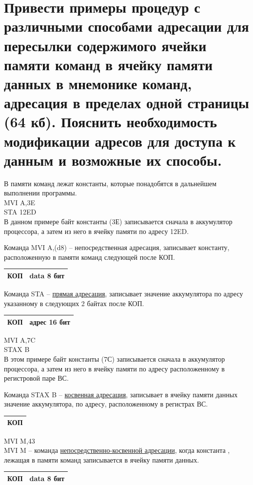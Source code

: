 \documentclass[unicode, 12pt, a4paper, oneside]{article}
\begin{document}
\section{Привести примеры процедур с различными способами адресации для пересылки содержимого ячейки памяти команд в ячейку памяти данных в мнемонике команд, адресация в пределах одной страницы (64 кб). Пояснить необходимость модификации адресов для доступа к данным и возможные их способы.}

В памяти команд лежат константы, которые понадобятся в дальнейшем выполнении программы.\\
MVI A,3E\\
STA 12ED\\
В данном примере байт константы (3Е) записывается сначала в аккумулятор процессора, а затем из него в ячейку памяти по адресу 12ED.

Команда MVI A,(d8) -- непосредственная адресация, записывает константу, расположенную в памяти команд  следующей после КОП.
\begin{center}
\begin{tabular}{|c|c|}
\hline КОП  & data 8 бит \\  
\hline 
\end{tabular}
\end{center}
Команда STA -- \underline{прямая адресация}, записывает значение аккумулятора по адресу указанному в следующих 2 байтах после КОП.
\begin{center}
\begin{tabular}{|c|c|}
\hline КОП & адрес 16 бит \\ 
\hline 
\end{tabular}
\end{center}
MVI A,7C\\ 
STAX B\\
В этом примере байт константы (7С) записывается сначала в аккумулятор процессора, а затем из него в ячейку памяти по адресу расположенному в регистровой паре ВС.

Команда STAX B -- \underline{косвенная адресация}, записывает в ячейку памяти данных значение аккумулятора, по адресу, расположенному в регистрах ВС.
\begin{center}
\begin{tabular}{|c|}
\hline КОП \\ 
\hline 
\end{tabular}
\end{center}
MVI M,43\\
MVI M -- команда \underline{непосредственно-косвенной адресации}, когда константа , лежащая в памяти команд записывается в ячейку памяти данных.
\begin{center}
\begin{tabular}{|c|c|}
\hline КОП & data 8 бит \\ 
\hline 
\end{tabular}
\end{center}
\end{document}
